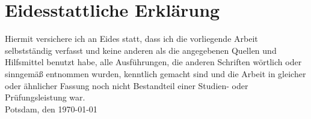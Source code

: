 \pagebreak
\thispagestyle{empty}
\section*{Eidesstattliche Erklärung}

Hiermit versichere ich an Eides statt, dass ich die vorliegende Arbeit selbstständig verfasst und keine anderen als die angegebenen Quellen und Hilfsmittel benutzt habe, alle Ausführungen, die anderen Schriften wörtlich oder sinngemäß entnommen wurden, kenntlich gemacht sind und die Arbeit in gleicher oder ähnlicher Fassung noch nicht Bestandteil einer Studien- oder Prüfungsleistung war.\\[5cm]

Potsdam, den \today \hfill \autorname%
